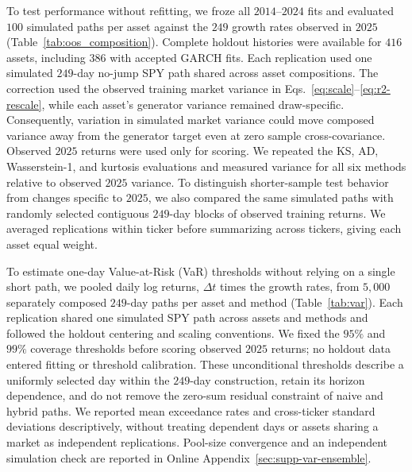 To test performance without refitting, we froze all $2014$--$2024$
fits and evaluated $100$ simulated paths per asset against the $249$
growth rates observed in $2025$ (Table~\ref{tab:oos_composition}).
Complete holdout histories were available for $416$ assets, including
$386$ with accepted GARCH fits. Each replication used one simulated
$249$-day no-jump SPY path shared across asset compositions. The
correction used the observed training market variance in
Eqs.~\eqref{eq:scale}--\eqref{eq:r2-rescale}, while each asset's
generator variance remained draw-specific. Consequently, variation
in simulated market variance could move composed variance away from
the generator target even at zero sample cross-covariance. Observed
$2025$ returns were used only for scoring. We repeated the KS, AD,
Wasserstein-1, and kurtosis evaluations and measured variance for all
six methods relative to observed $2025$ variance. To distinguish
shorter-sample test behavior from changes specific to $2025$, we
also compared the same simulated paths with randomly selected
contiguous $249$-day blocks of observed training returns. We averaged
replications within ticker before summarizing across tickers, giving
each asset equal weight.

To estimate one-day Value-at-Risk (VaR) thresholds without relying on
a single short path, we pooled daily log returns, $\Delta t$ times
the growth rates, from $5{,}000$ separately composed $249$-day paths
per asset and method (Table~\ref{tab:var}). Each replication shared
one simulated SPY path across assets and methods and followed the
holdout centering and scaling conventions. We fixed the $95\%$ and
$99\%$ coverage thresholds before scoring observed $2025$ returns;
no holdout data entered fitting or threshold calibration. These
unconditional thresholds describe a uniformly selected day within the
$249$-day construction, retain its horizon dependence, and do not
remove the zero-sum residual constraint of naive and hybrid paths.
We reported mean exceedance rates and cross-ticker standard deviations
descriptively, without treating dependent days or assets sharing a
market as independent replications. Pool-size convergence and an
independent simulation check are reported in Online
Appendix~\ref{sec:supp-var-ensemble}.


